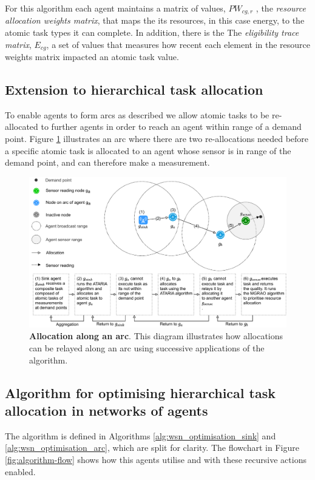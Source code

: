 For this algorithm each agent maintains a matrix of values, $PW_{cg,r}$ , the \textit{resource allocation weights matrix}, that maps the its resources, in this case energy, to the atomic task types it can complete. In addition, there is the The \textit{eligibility trace matrix}, $E_{cg}$, a set of values that measures how recent each element in the resource weights matrix impacted an atomic task value.


\subsection{Extension to hierarchical task allocation}

To enable agents to form arcs as described we allow atomic tasks to be re-allocated to further agents in order to reach an agent within range of a demand point. Figure \ref{fig:arc-flow} illustrates an arc where there are two re-allocations needed before a specific atomic task is allocated to an agent whose sensor is in range of the demand point, and can therefore make a measurement.

\begin{figure}[ht]
	\centering
	\includegraphics[width=0.9\linewidth]{arc-flow}
	\caption{\textbf{Allocation along an arc}. This diagram illustrates how allocations can be relayed along an arc using successive applications of the \acronymATARIA{}{} algorithm.}
	\label{fig:arc-flow}
\end{figure}

\subsection{Algorithm for optimising hierarchical task allocation in networks of agents}

The \acronymWSNOptimisationExtended{}{} algorithm is defined in Algorithms \ref{alg:wsn_optimisation_sink}
and \ref{alg:wsn_optimisation_arc}, which are split for clarity. The flowchart in Figure \ref{fig:algorithm-flow} shows how this agents utilise \acronymATARIA{}{} and \acronymMGRAO{}{} with these recursive actions enabled. 


